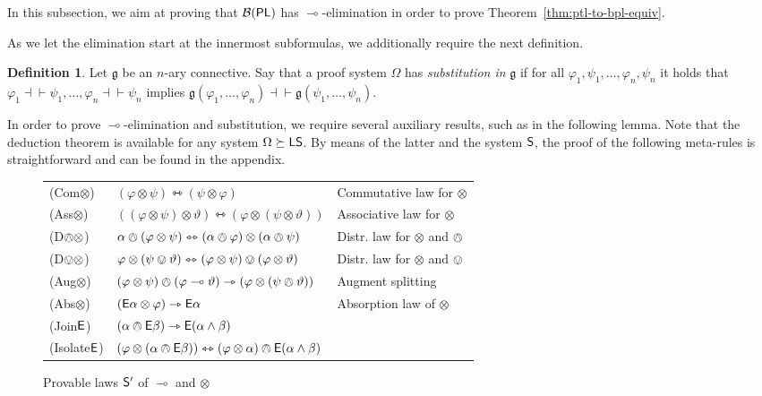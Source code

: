 \documentclass[a4paper,english,fleqn,11pt,final]{scrartcl}
\newcommand{\logicOpFont}[1]{\mathsf{#1}}
\newcommand{\logic}[1]{\ensuremath{\mathsf{#1}}\xspace}
\newcommand{\PL}{\logic{PL}}
\newcommand{\E}{\protect\ensuremath\logicOpFont{E}}
\newcommand{\calB}{\protect\ensuremath{\mathcal{B}}}
\newcommand{\sfS}{\protect\ensuremath{\mathsf{S}}}
\newcommand{\sfL}{\protect\ensuremath{\mathsf{L}}}
\newcommand{\limp}{\multimap}
\newcommand{\timp}{\rightarrowtriangle}
\newcommand{\tequiv}{\leftrightarrowtriangle}
\newcommand{\eqpr}{\dashv\vdash}
\newcommand{\tens}{\otimes}
\newcommand{\Deriv}[1]{{\normalfont\textsf{#1}}}
\newcommand{\oland}{\owedge}
\theoremstyle{plain}
\theoremstyle{definition}
\newtheorem{definition}[theorem]{Definition}
\begin{document}
In this subsection, we aim at proving that $\calB(\PL)$ has $\limp$-elimination in order to prove Theorem~\ref{thm:ptl-to-bpl-equiv}.

As we let the elimination start at the innermost subformulas, we additionally require the next definition.

\begin{definition}
Let $\mathfrak{g}$ be an $n$-ary connective.
Say that a proof system $\Omega$ has \emph{substitution in }$\mathfrak{g}$ if for all $\varphi_1,\psi_1,\ldots,\varphi_n,\psi_n$ it holds that $\varphi_1 \eqpr \psi_1, \ldots, \varphi_n \eqpr \psi_n$ implies $\mathfrak{g}(\varphi_1, \ldots, \varphi_n) \eqpr \mathfrak{g}(\psi_1, \ldots, \psi_n)$.
\end{definition}

\label{pg:metarules}

In order to prove $\limp$-elimination and substitution, we require several auxiliary results, such as in the following lemma.
Note that the deduction theorem is available for any system $\Omega \succeq \sfL\sfS$.
By means of the latter and the system $\sfS$, the proof of the following meta-rules is straightforward and can be found in the appendix.

\begin{figure}[b]\centering
\begin{tabular}{lll}
		\toprule
		\Deriv{(Com$\tens$)}&$(\varphi \tens \psi) \tequiv (\psi \tens \varphi)$&Commutative law for $\tens$\\
		\Deriv{(Ass$\tens$)}&$((\varphi \tens \psi)\tens\vartheta) \tequiv (\varphi \tens(\psi\tens \vartheta))$&Associative law for $\tens$\\
		\Deriv{(D$\oland\tens$)}&$\alpha \oland (\varphi \tens \psi) \tequiv (\alpha \oland \varphi) \tens (\alpha \oland \psi)$&Distr. law for $\tens$ and $\oland$\\
		\Deriv{(D$\ovee\tens$)}&$\varphi \tens (\psi \ovee \vartheta) \tequiv (\varphi \tens \psi) \ovee (\varphi \tens \vartheta)$&Distr. law for $\tens$ and $\ovee$\\
		\Deriv{(Aug$\tens$)}&$(\varphi \tens \psi) \oland (\varphi \limp \vartheta) \timp (\varphi \tens (\psi \oland \vartheta))$&Augment splitting\\
		\Deriv{(Abs$\tens$)}&$(\E \alpha \tens \varphi) \timp \E\alpha$&Absorption law of $\tens$\\
		\Deriv{(Join$\E$)}&$(\alpha \oland \E\beta) \timp \E(\alpha \land \beta)$&\\
		\Deriv{(Isolate$\E$)}&$(\varphi \tens (\alpha \oland \E\beta)) \tequiv (\varphi \tens \alpha) \oland \E(\alpha\land\beta)$&\\
		\bottomrule
	\end{tabular}
	\caption{Provable laws $\sfS'$ of $\limp$ and $\tens$}\label{fig:splitting2}
\end{figure}
\end{document}
